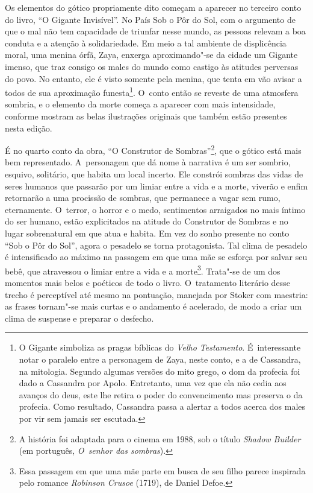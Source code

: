 Os elementos do gótico propriamente dito começam a aparecer no terceiro
conto do livro, ``O Gigante Invisível''. No País Sob o Pôr do Sol, com o
argumento de que o mal não tem capacidade de triunfar nesse mundo, as
pessoas relevam a boa conduta e a atenção à solidariedade. Em meio a
tal ambiente de displicência moral, uma menina órfã, Zaya, enxerga
aproximando"-se da cidade um Gigante imenso, que traz consigo os males do
mundo como castigo às atitudes perversas do povo. No entanto, ele é
visto somente pela menina, que tenta em vão avisar a todos de sua
aproximação funesta\footnote{O Gigante simboliza as pragas bíblicas do
\emph{Velho Testamento}. É~interessante notar o paralelo entre a
personagem de Zaya, neste conto, e a de Cassandra, na mitologia. Segundo
algumas versões do mito grego, o dom da profecia foi dado a Cassandra
por Apolo. Entretanto, uma vez que ela não cedia aos avanços do deus,
este lhe retira o poder do convencimento mas preserva o da profecia.
Como resultado, Cassandra passa a alertar a todos acerca dos males por
vir sem jamais ser escutada.}. O~conto então se reveste de
uma atmosfera sombria, e o elemento da morte começa a aparecer com mais
intensidade, conforme mostram as belas ilustrações originais que também
estão presentes nesta edição.

É no quarto conto da obra, ``O Construtor de Sombras''\footnote{A história foi adaptada para o cinema em
1988, sob o título \emph{Shadow Builder} (em português, \emph{O~senhor
das sombras}).}, que o gótico está mais bem representado. A~personagem que dá nome à narrativa é um ser sombrio, esquivo, solitário,
que habita um local incerto. Ele constrói sombras das vidas de seres
humanos que passarão por um limiar entre a vida e a morte, viverão e
enfim retornarão a uma procissão de sombras, que permanece a vagar sem
rumo, eternamente. O~terror, o horror e o medo, sentimentos arraigados
no mais íntimo do ser humano, estão explicitados na atitude do
Construtor de Sombras e no lugar sobrenatural em que atua e habita. Em
vez do sonho presente no conto ``Sob o Pôr do Sol'', agora o pesadelo se
torna protagonista. Tal clima de pesadelo é intensificado ao máximo na
passagem em que uma mãe se esforça por salvar seu bebê, que atravessou o
limiar entre a vida e a morte\footnote{Essa passagem em que uma mãe parte em busca
de seu filho parece inspirada pelo romance \emph{Robinson Crusoe}
(1719), de Daniel Defoe.}. Trata"-se de um
dos momentos mais belos e poéticos de todo o livro. O~tratamento
literário desse trecho é perceptível até mesmo na pontuação, manejada
por Stoker com maestria: as frases tornam"-se mais curtas e o andamento é
acelerado, de modo a criar um clima de suspense e preparar o desfecho.

